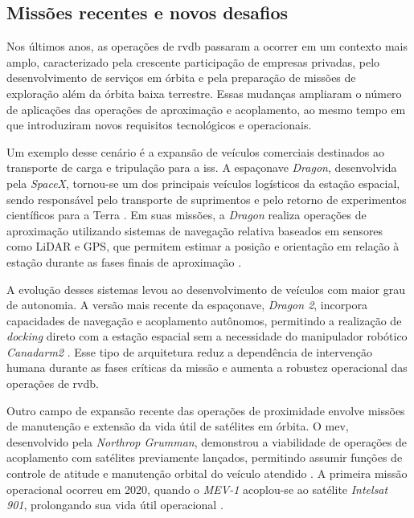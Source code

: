\subsection{Missões recentes e novos desafios}
\label{subsec_missoes_recentes_desafios}

Nos últimos anos, as operações de \gls{rvdb} passaram a ocorrer em um contexto mais amplo, caracterizado pela crescente participação de empresas privadas, pelo desenvolvimento de serviços em órbita e pela preparação de missões de exploração além da órbita baixa terrestre. 
Essas mudanças ampliaram o número de aplicações das operações de aproximação e acoplamento, ao mesmo tempo em que introduziram novos requisitos tecnológicos e operacionais.

Um exemplo desse cenário é a expansão de veículos comerciais destinados ao transporte de carga e tripulação para a \gls{iss}. 
A espaçonave \emph{Dragon}, desenvolvida pela \emph{SpaceX}, tornou-se um dos principais veículos logísticos da estação espacial, sendo responsável pelo transporte de suprimentos e pelo retorno de experimentos científicos para a Terra \cite{bell2018,nasaDragonReturn}. 
Em suas missões, a \emph{Dragon} realiza operações de aproximação utilizando sistemas de navegação relativa baseados em sensores como LiDAR e GPS, que permitem estimar a posição e orientação em relação à estação durante as fases finais de aproximação \cite{nasaspaceflightDragonISS}.

A evolução desses sistemas levou ao desenvolvimento de veículos com maior grau de autonomia. 
A versão mais recente da espaçonave, \emph{Dragon 2}, incorpora capacidades de navegação e acoplamento autônomos, permitindo a realização de \emph{docking} direto com a estação espacial sem a necessidade do manipulador robótico \emph{Canadarm2} \cite{nasaStarshipDocking}. 
Esse tipo de arquitetura reduz a dependência de intervenção humana durante as fases críticas da missão e aumenta a robustez operacional das operações de \gls{rvdb}.

Outro campo de expansão recente das operações de proximidade envolve missões de manutenção e extensão da vida útil de satélites em órbita. 
O \gls{mev}, desenvolvido pela \emph{Northrop Grumman}, demonstrou a viabilidade de operações de acoplamento com satélites previamente lançados, permitindo assumir funções de controle de atitude e manutenção orbital do veículo atendido \cite{mev1}. 
A primeira missão operacional ocorreu em 2020, quando o \emph{MEV-1} acoplou-se ao satélite \emph{Intelsat 901}, prolongando sua vida útil operacional \cite{nytMEV1}.

